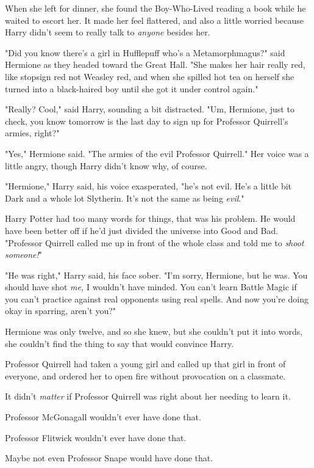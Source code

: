 When she left for dinner, she found the Boy-Who-Lived reading a book while he 
waited to escort her. It made her feel flattered, and also a little worried 
because Harry didn't seem to really talk to \emph{anyone} besides her.

"Did you know there's a girl in Hufflepuff who's a Metamorphmagus?" said 
Hermione as they headed toward the Great Hall. "She makes her hair really red, 
like stopsign red not Weasley red, and when she spilled hot tea on herself she 
turned into a black-haired boy until she got it under control again."

"Really? Cool," said Harry, sounding a bit distracted. "Um, Hermione, just to 
check, you know tomorrow is the last day to sign up for Professor Quirrell's 
armies, right?"

"Yes," Hermione said. "The armies of the evil Professor Quirrell." Her voice 
was a little angry, though Harry didn't know why, of course.

"Hermione," Harry said, his voice exasperated, "he's not evil. He's a little 
bit Dark and a whole lot Slytherin. It's not the same as being \emph{evil}."

Harry Potter had too many words for things, that was his problem. He would have 
been better off if he'd just divided the universe into Good and Bad. "Professor 
Quirrell called me up in front of the whole class and told me to \emph{shoot 
someone!}"

"He was right," Harry said, his face sober. "I'm sorry, Hermione, but he was. 
You should have shot \emph{me,} I wouldn't have minded. You can't learn Battle 
Magic if you can't practice against real opponents using real spells. And now 
you're doing okay in sparring, aren't you?"

Hermione was only twelve, and so she knew, but she couldn't put it into words, 
she couldn't find the thing to say that would convince Harry.

Professor Quirrell had taken a young girl and called up that girl in front of 
everyone, and ordered her to open fire without provocation on a classmate.

It didn't \emph{matter} if Professor Quirrell was right about her needing to 
learn it.

Professor McGonagall wouldn't ever have done that.

Professor Flitwick wouldn't ever have done that.

Maybe not even Professor Snape would have done that.


